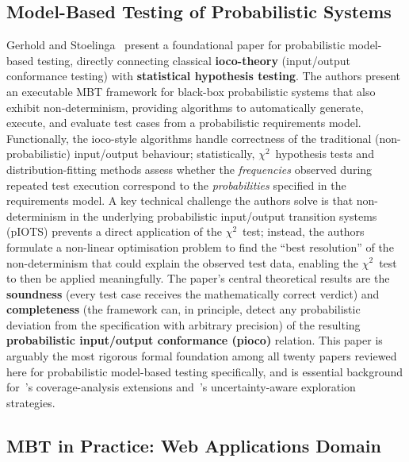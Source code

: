 

\subsection{Model-Based Testing of Probabilistic Systems}
\label{sec:lr_gerhold}

Gerhold and Stoelinga~\cite{gerhold2016probabilistic} present a
foundational paper for probabilistic model-based testing, directly
connecting classical \textbf{ioco-theory} (input/output conformance
testing) with \textbf{statistical hypothesis testing}.  The authors
present an executable MBT framework for black-box probabilistic systems
that also exhibit non-determinism, providing algorithms to automatically
generate, execute, and evaluate test cases from a probabilistic
requirements model.  Functionally, the ioco-style algorithms handle
correctness of the traditional (non-probabilistic) input/output
behaviour; statistically, $\chi^{2}$~hypothesis tests and
distribution-fitting methods assess whether the \emph{frequencies}
observed during repeated test execution correspond to the
\emph{probabilities} specified in the requirements model.  A key
technical challenge the authors solve is that non-determinism in the
underlying probabilistic input/output transition systems (pIOTS)
prevents a direct application of the $\chi^{2}$~test; instead, the
authors formulate a non-linear optimisation problem to find the ``best
resolution'' of the non-determinism that could explain the observed test
data, enabling the $\chi^{2}$~test to then be applied meaningfully.  The
paper's central theoretical results are the \textbf{soundness} (every
test case receives the mathematically correct verdict) and
\textbf{completeness} (the framework can, in principle, detect any
probabilistic deviation from the specification with arbitrary precision)
of the resulting \textbf{probabilistic input/output conformance (pioco)}
relation.  This paper is arguably the most rigorous formal foundation
among all twenty papers reviewed here for probabilistic model-based
testing specifically, and is essential background
for~\cite{prasetya2021coverage}'s coverage-analysis extensions
and~\cite{camilli2021uncertainty}'s uncertainty-aware exploration
strategies.

\subsection{MBT in Practice: Web Applications Domain}
\label{sec:lr_garousi_practice}


